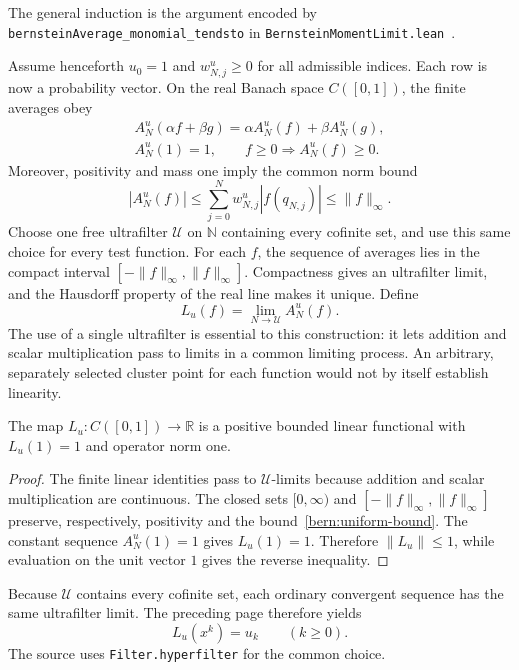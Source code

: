 The general induction is the argument encoded by
\texttt{bernsteinAverage\_monomial\_tendsto} in
\texttt{BernsteinMomentLimit.lean}~\cite{source}.

\label{bern:functional-page}

Assume henceforth $u_0=1$ and $w^u_{N,j}\ge0$ for all admissible
indices. Each row is now a probability vector. On the real Banach
space $C([0,1])$, the finite averages obey
\[
 \begin{gathered}
 A_N^u(\alpha f+\beta g)=\alpha A_N^u(f)+\beta A_N^u(g),\\
 A_N^u(1)=1,\qquad f\ge0\Longrightarrow A_N^u(f)\ge0.
 \end{gathered}
\]
Moreover, positivity and mass one imply the common norm bound
\begin{equation}\label{bern:uniform-bound}
 |A_N^u(f)|\le\sum_{j=0}^Nw^u_{N,j}|f(q_{N,j})|
             \le\|f\|_\infty.
\end{equation}
Choose one free ultrafilter $\mathcal U$ on $\mathbb N$ containing
every cofinite set, and use this same choice for every test function.
For each $f$, the sequence of averages lies in the compact interval
$[-\|f\|_\infty,\|f\|_\infty]$. Compactness gives an ultrafilter
limit, and the Hausdorff property of the real line makes it unique.
Define
\[
 L_u(f)=\lim_{N\to\mathcal U}A_N^u(f).
\]
The use of a single ultrafilter is essential to this construction:
it lets addition and scalar multiplication pass to limits in a
common limiting process. An arbitrary, separately selected cluster
point for each function would not by itself establish linearity.

\begin{proposition}\label{bern:positive-functional}
The map $L_u:C([0,1])\to\mathbb R$ is a positive bounded linear
functional with $L_u(1)=1$ and operator norm one.
\end{proposition}
\begin{proof}
The finite linear identities pass to $\mathcal U$-limits because
addition and scalar multiplication are continuous. The closed sets
$[0,\infty)$ and $[-\|f\|_\infty,\|f\|_\infty]$ preserve,
respectively, positivity and the bound~\eqref{bern:uniform-bound}.
The constant sequence $A_N^u(1)=1$ gives $L_u(1)=1$. Therefore
$\|L_u\|\le1$, while evaluation on the unit vector $1$ gives the
reverse inequality.
\end{proof}

Because $\mathcal U$ contains every cofinite set, each ordinary
convergent sequence has the same ultrafilter limit. The preceding
page therefore yields
\[
 L_u(x^k)=u_k\qquad(k\ge0).
\]
The source uses \texttt{Filter.hyperfilter} for the common choice.

